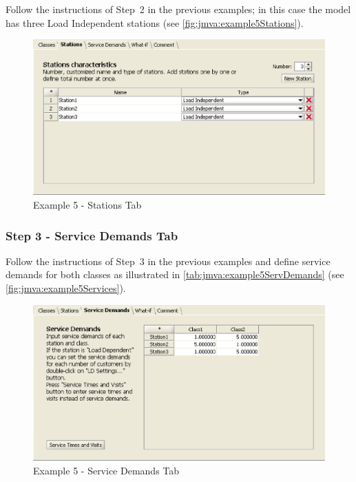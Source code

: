 Follow the instructions of Step~2 in the previous examples; in this
case the model has three Load Independent stations (see
\autoref{fig:jmva:example5Stations}).

\begin{figure}[htbp]
    \begin{center}
        \includegraphics[scale=.5]{img/jmva/example5Stations}
    \end{center}
    \caption{Example 5 - Stations Tab}
    \label{fig:jmva:example5Stations}
\end{figure}

\subsubsection{Step 3 - Service Demands Tab}

Follow the instructions of Step~3 in the previous examples and
define service demands for both classes as illustrated in
\autoref{tab:jmva:example5ServDemands} (see
\autoref{fig:jmva:example5Services}).

\begin{figure}[htbp]
    \begin{center}
        \includegraphics[scale=.5]{img/jmva/example5Services}
    \end{center}
    \caption{Example 5 - Service Demands Tab}
    \label{fig:jmva:example5Services}
\end{figure}

